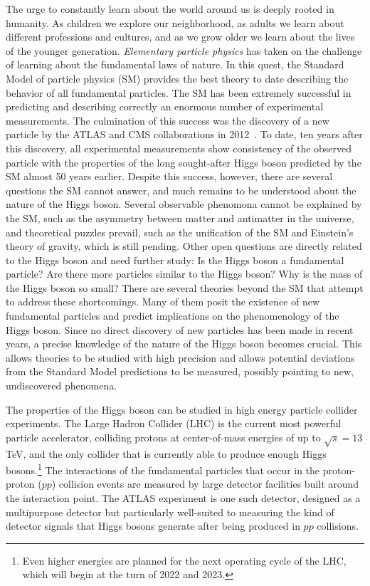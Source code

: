 
The urge to constantly learn about the world around us is deeply rooted in humanity.
As children we explore our neighborhood, as adults we learn about different professions and cultures, and as we grow older we learn about the lives of the younger generation. 
\emph{Elementary particle physics} has taken on the challenge of learning about the fundamental laws of nature. 
In this quest, the Standard Model of particle physics (SM) provides the best theory to date describing the behavior of all fundamental particles. 
The SM has been extremely successful in predicting and describing correctly an enormous number of experimental measurements. 
The culmination of this success was the discovery of a new particle by the ATLAS and CMS collaborations in 2012~\cite{HIGG-2012-27,CMS-HIG-12-028}.
To date, ten years after this discovery, all experimental measurements show consistency of the observed particle with the properties of the long sought-after Higgs boson predicted by the SM almost 50 years earlier.
Despite this success, however, there are several questions the SM cannot answer, and much remains to be understood about the nature of the Higgs boson.
Several observable phenomona cannot be explained by the SM, such as the asymmetry between matter and antimatter in the universe, and theoretical puzzles prevail, such as the unification of the SM and Einstein's theory of gravity, which is still pending.
Other open questions are directly related to the Higgs boson and need further study: Is the Higgs boson a fundamental particle? Are there more particles similar to the Higgs boson? Why is the mass of the Higgs boson so small? 
There are several theories beyond the SM that attempt to address these shortcomings. 
Many of them posit the existence of new fundamental particles and predict implications on the phenomenology of the Higgs boson.
Since no direct discovery of new particles has been made in recent years, a precise knowledge of the nature of the Higgs boson becomes crucial. 
This allows theories to be studied with high precision and allows potential deviations from the Standard Model predictions to be measured, possibly pointing to new, undiscovered phenomena. 

The properties of the Higgs boson can be studied in high energy particle collider experiments. 
The Large Hadron Collider (LHC) is the current most powerful particle accelerator, colliding protons at center-of-mass energies of up to $\sqrt{s} = 13\,$TeV, and the only collider that is currently able to produce enough Higgs bosons.\footnote{Even higher energies are planned for the next operating cycle of the LHC, which will begin at the turn of 2022 and 2023.}
The interactions of the fundamental particles that occur in the proton-proton ($pp$) collision events are measured by large detector facilities built around the interaction point. 
The ATLAS experiment is one such detector, designed as a multipurpose detector but particularly well-suited to measuring the kind of detector signals that Higgs bosons generate after being produced in $pp$ collisions.

